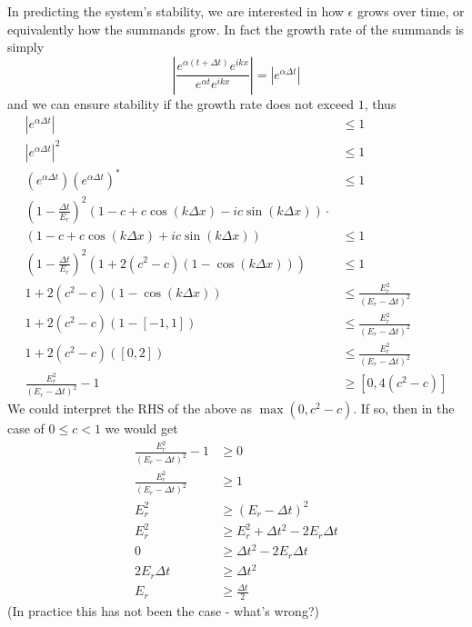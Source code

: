 \documentclass[11pt]{article}
\begin{document}
In predicting the system's stability, we are interested in how $\epsilon$ grows over time, or equivalently how the summands grow. In fact the growth rate of the summands is simply
\[
\left|\frac{e^{\alpha\left(t+\Delta t\right)}e^{ikx}}{e^{\alpha t}e^{ikx}}\right| = \left|e^{\alpha\Delta t}\right|
\]
and we can ensure stability if the growth rate does not exceed $1$, thus
\begin{align*}
\left|e^{\alpha\Delta t}\right|&\leq 1 \\
\left|e^{\alpha\Delta t}\right|^2&\leq 1 \\
\left(e^{\alpha\Delta t}\right)\left(e^{\alpha\Delta t}\right)^*&\leq 1 \\
\left(1-\frac{\Delta t}{E_r}\right)^2
\left(1-c+c\cos\left(k\Delta x\right)-ic\sin\left(k\Delta x\right)\right) \cdot \\
\left(1-c+c\cos\left(k\Delta x\right)+ic\sin\left(k\Delta x\right)\right)&\leq 1 \\
\left(1-\frac{\Delta t}{E_r}\right)^2\left(1+2(c^2-c)(1-\cos(k\Delta x))\right) &\leq 1 \\
1+2(c^2-c)(1-\cos(k\Delta x)) &\leq \frac{E_r^2}{\left(E_r-\Delta t\right)^2}	\tag{$\forall k$} \\
1+2(c^2-c)(1-[-1,1]) &\leq \frac{E_r^2}{\left(E_r-\Delta t\right)^2} \\
1+2(c^2-c)([0,2]) &\leq \frac{E_r^2}{\left(E_r-\Delta t\right)^2} \\
\frac{E_r^2}{\left(E_r-\Delta t\right)^2}-1 &\geq \left[0,4(c^2-c)\right]		\tag{for all values in range}
\end{align*}
We could interpret the RHS of the above as $\max\left(0,c^2-c\right)$. If so, then in the case of $0\leq c<1$ we would get
\begin{align*}
\frac{E_r^2}{\left(E_r-\Delta t\right)^2} -1 &\geq 0 \\
\frac{E_r^2}{\left(E_r-\Delta t\right)^2} &\geq 1 \\
E_r^2 &\geq \left(E_r-\Delta t\right)^2 \\
E_r^2 &\geq E_r^2 + \Delta t^2 -2E_r\Delta t \\
0 &\geq \Delta t^2 -2E_r\Delta t \\
2E_r\Delta t &\geq \Delta t^2 \\
E_r &\geq \frac{\Delta t}{2}
\end{align*}
(In practice this has not been the case - what's wrong?)

\newpage


\end{document}
